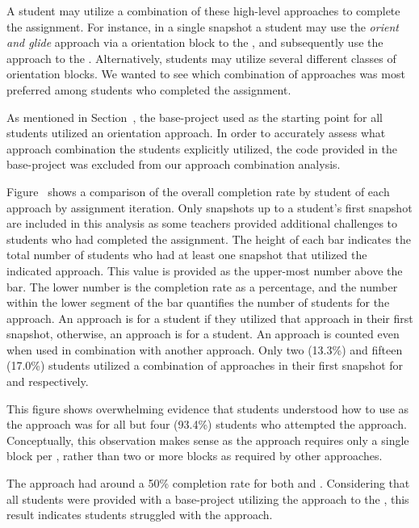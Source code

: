 A student may utilize a combination of these high-level approaches to complete
the assignment. For instance, in a single snapshot a student may use the
\emph{orient and glide} approach via a \rel{} orientation block to \catch{} the
\bear{}, and subsequently use the \glideto{} approach to \catch{} the
\horse{}. Alternatively, students may utilize several different classes of
orientation blocks. We wanted to see which combination of approaches was most
preferred among students who completed the assignment.

As mentioned in Section~, the base-project used as the
starting point for all students utilized an \abs{} orientation approach. In
order to accurately assess what approach combination the students explicitly
utilized, the code provided in the base-project was excluded from our approach
combination analysis.

Figure~ shows a comparison of the
overall completion rate by student of each approach by assignment
iteration. Only snapshots up to a student's first \com{} snapshot are included
in this analysis as some teachers provided additional challenges to students
who had completed the assignment. The height of each bar indicates the total
number of students who had at least one snapshot that utilized the indicated
approach. This value is provided as the upper-most number above the bar. The
lower number is the completion rate as a percentage, and the number within the
lower segment of the bar quantifies the number of \com{} students for the
approach. An approach is \com{} for a student if they utilized that approach in
their first \com{} snapshot, otherwise, an approach is \incom{} for a
student. An approach is counted even when used in combination with another
approach. Only two (13.3\%) and fifteen (17.0\%) \com{} students utilized a
combination of approaches in their first \com{} snapshot for \sone{} and
\stwo{} respectively.

This figure shows overwhelming evidence that students understood how to use
\glideto{} as the approach was \com{} for all but four (93.4\%) students who
attempted the approach. Conceptually, this observation makes sense as the
approach requires only a single block per \catch{}, rather than two or more
blocks as required by other approaches.

The \abs{} approach had around a 50\% completion rate for both \sone{} and
\stwo{}. Considering that all students were provided with a base-project
utilizing the \abs{} approach to \catch{} the \zebra{}, this result indicates
students struggled with the \abs{} approach.

